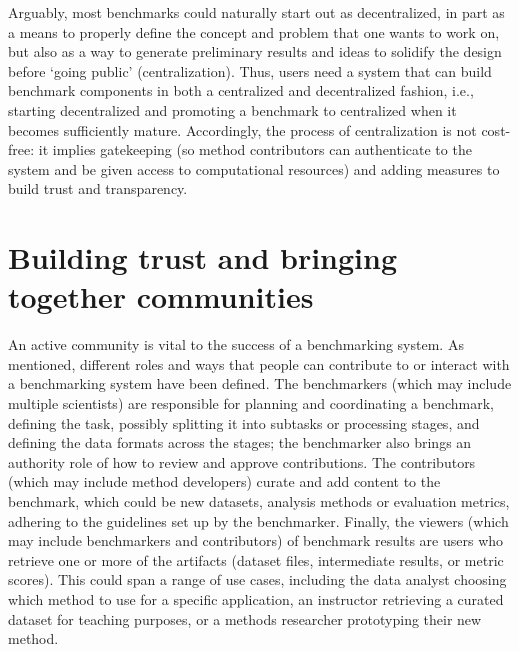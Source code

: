 \documentclass[11pt]{article}
\begin{document}
Arguably, most benchmarks could naturally start out as decentralized, in part as a means to properly define the concept and problem that one wants to work on, but also as a way to generate preliminary results and ideas to solidify the design before `going public' (centralization). Thus, users need a system that can build benchmark components in both a centralized and decentralized fashion, i.e., starting decentralized and promoting a benchmark to centralized when it becomes sufficiently mature. Accordingly, the process of centralization is not cost-free: it implies gatekeeping (so method contributors can authenticate to the system and be given access to computational resources) and adding measures to build trust and transparency.

\section*{Building trust and bringing together communities}

An active community is vital to the success of a benchmarking system. As mentioned, different roles and ways that people can contribute to or interact with a benchmarking system have been defined. The benchmarkers (which may include multiple scientists) are responsible for planning and coordinating a benchmark, defining the task, possibly splitting it into subtasks or processing stages, and defining the data formats across the stages; the benchmarker also brings an authority role of how to review and approve contributions. The contributors (which may include method developers) curate and add content to the benchmark, which could be new datasets, analysis methods or evaluation metrics, adhering to the guidelines set up by the benchmarker. Finally, the viewers (which may include benchmarkers and contributors) of benchmark results are users who retrieve one or more of the artifacts (dataset files, intermediate results, or metric scores). This could span a range of use cases, including the data analyst choosing which method to use for a specific application, an instructor retrieving a curated dataset for teaching purposes, or a methods researcher prototyping their new method.
\end{document}
